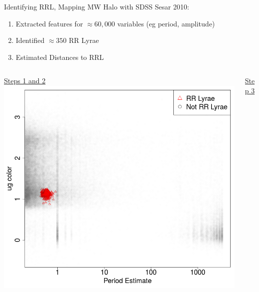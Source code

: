 \documentclass[12pt]{beamer}
\begin{document}
\begin{frame}{Identifying RRL, Mapping MW Halo with SDSS}
  Sesar 2010:
  \begin{enumerate}
  \item Extracted features for $\approx 60,000$ variables (eg period, amplitude)
  \item Identified $\approx 350$ RR Lyrae
  \item Estimated Distances to RRL
  \end{enumerate}

  \begin{columns}
    \begin{column}{0.5\textwidth}

      \vspace{-.22in}

      \begin{center}
        \underline{Steps 1 and 2}
        \includegraphics[scale=.2]{figs/sdss_color_period.png}
      \end{center}
      \end{column}
    \begin{column}{0.5\textwidth}

      \vspace{-.55in}

      \begin{center}
      \underline{Step 3}
      \end{center}
      

\end{column}
\end{columns}
\end{frame}
\end{document}
